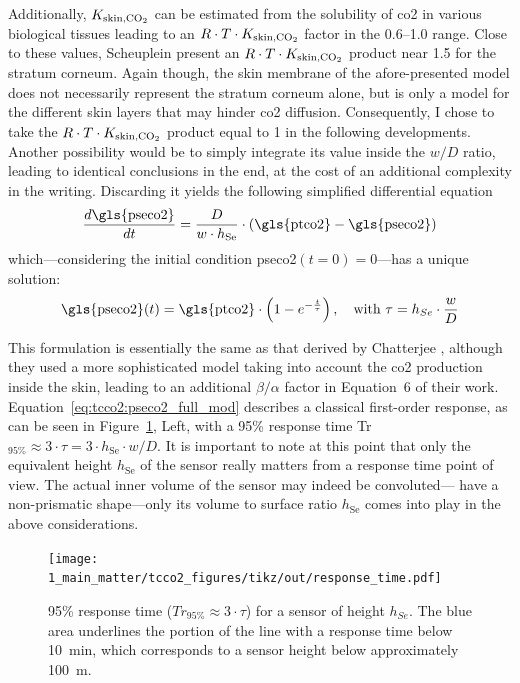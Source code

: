 Additionally, $K_\text{skin,\ce{CO_2}}$ can be estimated from the solubility of \gls{co2} in various biological tissues\cite{wright1934, nichols1957, scheuplein1976, gill1988} leading to an $R\cdot T\cdot K_\text{skin,\ce{CO_2}}$ factor in the 0.6--1.0 range. Close to these values, Scheuplein \etal{}\cite{scheuplein1976} present an $R\cdot T\cdot K_\text{skin,\ce{CO_2}}$ product near 1.5 for the stratum corneum. Again though, the skin membrane of the afore-presented model does not necessarily represent the stratum corneum alone, but is only a model for the different skin layers that may hinder \gls{co2} diffusion. Consequently, I chose to take the $R\cdot T\cdot K_\text{skin,\ce{CO_2}}$ product equal to 1 in the following developments. Another possibility would be to simply integrate its value inside the $w/D$ ratio, leading to identical conclusions in the end, at the cost of an additional complexity in the writing. Discarding it yields the following simplified differential equation
\begin{equation}
	\frac{d \text{\gls{pseco2}}}{dt} = \frac{D}{w \cdot h_\text{Se}} \cdot \left( \text{\gls{ptco2}} - \text{\gls{pseco2}} \right)
\end{equation}
which---considering the initial condition \gls{pseco2}$(t=0)=0$---has a unique solution:
\begin{equation}\label{eq:tcco2:pseco2_full_mod}
	\text{\gls{pseco2}}(t) = \text{\gls{ptco2}} \cdot \left( 1 - e^{-\frac{t}{\tau}} \right), \quad \text{with } \tau = h_{Se} \cdot \frac{w}{D}
\end{equation}

This formulation is essentially the same as that derived by Chatterjee \etal{}\cite{chatterjee2015}, although they used a more sophisticated model taking into account the \gls{co2} production inside the skin, leading to an additional $\beta/\alpha$ factor in Equation~6 of their work. Equation~\ref{eq:tcco2:pseco2_full_mod} describes a classical first-order response, as can be seen in Figure~\ref{fig:tcco2:response_time}, Left, with a 95\% response time Tr$_{95\%}\approx 3\cdot \tau = 3 \cdot h_\text{Se} \cdot w / D$. It is important to note at this point that only the equivalent height $h_\text{Se}$ of the sensor really matters from a response time point of view. The actual inner volume of the sensor may indeed be convoluted---\ie{} have a non-prismatic shape---only its volume to surface ratio $h_\text{Se}$ comes into play in the above considerations.

\begin{figure}
	\centering
	\texttt{[image: 1\_main\_matter/tcco2\_figures/tikz/out/response\_time.pdf]}
	\caption[Influence of a transcutaneous sensor's height on its response time.]{95\% response time ($Tr_{95\%} \approx 3\cdot \tau$) for a sensor of height $h_{Se}$. The blue area underlines the portion of the line with a response time below 10~min, which corresponds to a sensor height below approximately 100~\textmu{}m.}
	\label{fig:tcco2:response_time}
\end{figure}

